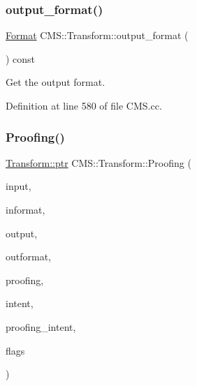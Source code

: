 \subsubsection{\texorpdfstring{output\+\_\+format()}{output\_format()}}
{\footnotesize\ttfamily \hyperlink{class_c_m_s_1_1_format}{Format} C\+M\+S\+::\+Transform\+::output\+\_\+format (\begin{DoxyParamCaption}\item[{void}]{ }\end{DoxyParamCaption}) const}



Get the output format. 



Definition at line 580 of file C\+M\+S.\+cc.

\mbox{\label{class_c_m_s_1_1_transform_ab67f92614a6ba25d1cc22c11d14f3c66}} 
\subsubsection{\texorpdfstring{Proofing()}{Proofing()}}
{\footnotesize\ttfamily \hyperlink{class_c_m_s_1_1_transform_ac0fcc21ddc52273f9ce95dba97ef1116}{Transform\+::ptr} C\+M\+S\+::\+Transform\+::\+Proofing (\begin{DoxyParamCaption}\item[{\hyperlink{class_c_m_s_1_1_profile_a7d5a80e1317d17dbfdf5ae69820ab08b}{Profile\+::ptr}}]{input,  }\item[{const \hyperlink{class_c_m_s_1_1_format}{Format} \&}]{informat,  }\item[{\hyperlink{class_c_m_s_1_1_profile_a7d5a80e1317d17dbfdf5ae69820ab08b}{Profile\+::ptr}}]{output,  }\item[{const \hyperlink{class_c_m_s_1_1_format}{Format} \&}]{outformat,  }\item[{\hyperlink{class_c_m_s_1_1_profile_a7d5a80e1317d17dbfdf5ae69820ab08b}{Profile\+::ptr}}]{proofing,  }\item[{\hyperlink{namespace_c_m_s_aabe6afbe3c2cd6188befc3096f1ea069}{Intent}}]{intent,  }\item[{\hyperlink{namespace_c_m_s_aabe6afbe3c2cd6188befc3096f1ea069}{Intent}}]{proofing\+\_\+intent,  }\item[{cms\+U\+Int32\+Number}]{flags }\end{DoxyParamCaption})\hspace{0.3cm}{\ttfamily [static]}}



